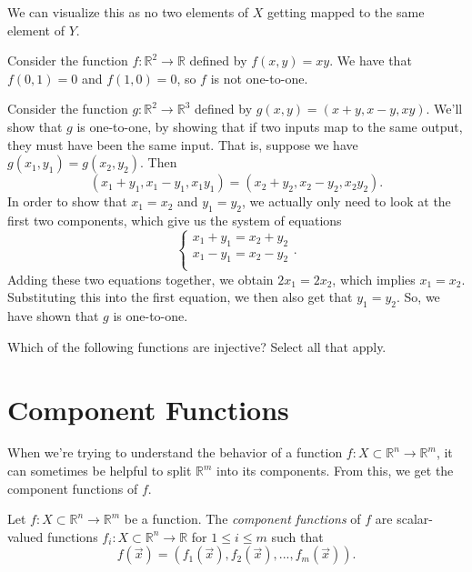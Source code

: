 \documentclass{ximera}
\begin{document}
We can visualize this as no two elements of $X$ getting mapped to the same element of $Y$.

\begin{example}
Consider the function $f:\mathbb{R}^2\rightarrow\mathbb{R}$ defined by $f(x,y) = xy$. We have that $f(0,1) = 0$ and $f(1,0)=0$, so $f$ is not one-to-one.

Consider the function $g:\mathbb{R}^2\rightarrow\mathbb{R}^3$ defined by $g(x,y) = (x+y, x-y, xy)$. We'll show that $g$ is one-to-one, by showing that if two inputs map to the same output, they must have been the same input. That is, suppose we have $g(x_1,y_1) = g(x_2,y_2)$. Then
\[
(x_1+y_1, x_1-y_1, x_1y_1) = (x_2+y_2, x_2-y_2, x_2y_2).
\]
In order to show that $x_1=x_2$ and $y_1=y_2$, we actually only need to look at the first two components, which give us the system of equations
\[
\begin{cases}
x_1+y_1 = x_2+y_2\\
x_1-y_1 = x_2-y_2\\
\end{cases}.
\]
Adding these two equations together, we obtain $2x_1 = 2x_2$, which implies $x_1 = x_2$. Substituting this into the first equation, we then also get that $y_1=y_2$. So, we have shown that $g$ is one-to-one.
\end{example}

\begin{problem}
Which of the following functions are injective? Select all that apply.
\begin{selectAll}
\end{selectAll}
\end{problem}

\section*{Component Functions}

When we're trying to understand the behavior of a function $f:X\subset \mathbb{R}^n\rightarrow \mathbb{R}^m$, it can sometimes be helpful to split $\mathbb{R}^m$ into its components. From this, we get the component functions of $f$.

\begin{definition}
Let $f:X\subset \mathbb{R}^n\rightarrow \mathbb{R}^m$ be a function. The \emph{component functions} of $f$ are scalar-valued functions $f_i:X\subset\mathbb{R}^n\rightarrow\mathbb{R}$ for $1\leq i\leq m$ such that 
\[
f(\vec{x}) = (f_1(\vec{x}),f_2(\vec{x}),...,f_m(\vec{x})).
\]
\end{definition}
\end{document}
